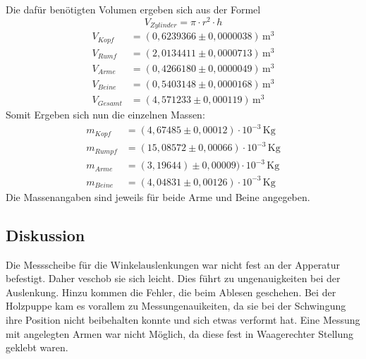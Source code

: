 \documentclass[
  bibliography=totoc,     %
  captions=tableheading,  %
  titlepage=firstiscover, %
]{scrartcl}
\begin{document}
Die dafür benötigten Volumen ergeben sich aus der Formel
\begin{equation}
  V_{Zylinder}= \pi \cdot r^2 \cdot h
\end{equation}
\begin{align}
  V_{Kopf} &= (0,6239366 \pm 0,0000038) \, \mathrm{m^3} \\
  V_{Rumf} &= (2,0134411 \pm 0,0000713) \, \mathrm{m^3} \\
  V_{Arme} &= (0,4266180 \pm 0,0000049) \, \mathrm{m^3} \\
  V_{Beine} &= (0,5403148 \pm 0,0000168) \, \mathrm{m^3} \\
  V_{Gesamt} &= (4,571233 \pm 0,000119) \, \mathrm{m^3}
\end{align}
Somit Ergeben sich nun die einzelnen Massen:
\begin{align}
  m_{Kopf} &= (4,67485 \pm 0,00012) \cdot 10^{-3} \, \mathrm{Kg}\\
  m_{Rumpf} &= (15,08572 \pm 0,00066)\cdot 10^{-3} \, \mathrm{Kg}\\
  m_{Arme} &= (3,19644) \pm 0,00009) \cdot 10^{-3} \, \mathrm{Kg}\\
  m_{Beine} &= (4,04831 \pm 0,00126) \cdot 10^{-3} \, \mathrm{Kg}
\end{align}
Die Massenangaben sind jeweils für beide Arme und Beine angegeben.
\subsection{Diskussion}
Die Messscheibe für die Winkelauslenkungen war nicht fest an der Apperatur befestigt.
Daher veschob sie sich leicht. Dies führt zu ungenauigkeiten bei der Auslenkung.
Hinzu kommen die Fehler, die beim Ablesen geschehen.
Bei der Holzpuppe kam es vorallem zu Messungenauikeiten,
da sie bei der Schwingung ihre Position nicht beibehalten konnte
und sich etwas verformt hat. Eine Messung mit angelegten Armen war nicht Möglich,
da diese fest in Waagerechter Stellung geklebt waren.

 
\end{document}
